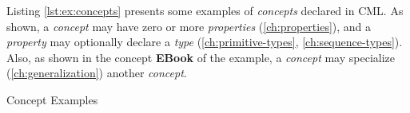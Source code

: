 Listing \ref{lst:ex:concepts} presents some examples of \emph{concepts} declared in CML.
As shown,
a \emph{concept} may have zero or more \emph{properties}
(\ref{ch:properties}),
and a \emph{property} may optionally declare a \emph{type}
(\ref{ch:primitive-types}, \ref{ch:sequence-types}).
Also, as shown in the concept \textbf{EBook} of the example,
a \emph{concept} may specialize
(\ref{ch:generalization})
another \emph{concept}.

\begin{code}
\verbatimfont{\small}

\caption{Concept Examples}
\label{lst:ex:concepts}
\end{code}
